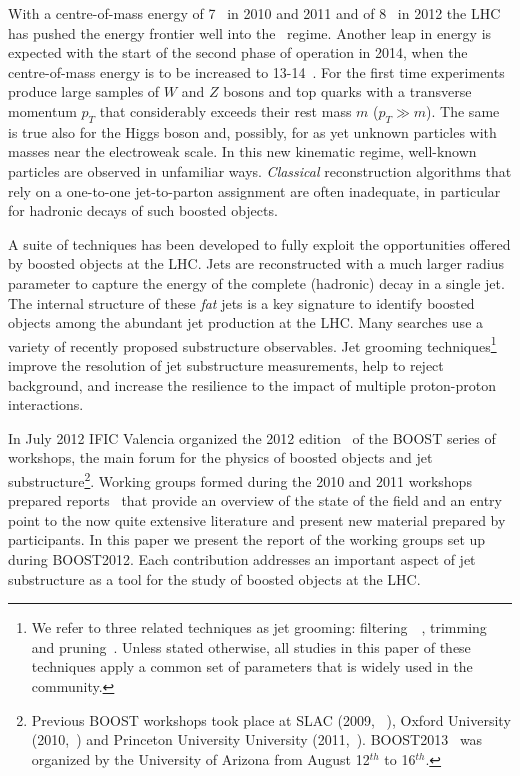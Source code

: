 
With a centre-of-mass energy of 7~\tev{} in 2010 and 2011 and 
of 8~\tev{} in 2012 the LHC has pushed the energy frontier
well into the~\tev{} regime. Another leap in energy is expected 
with the start of the second phase of operation in 2014, when the 
centre-of-mass energy is to be increased to 13-14~\tev{}.
For the first time experiments produce large samples of $W$ and $Z$ 
bosons and top quarks with a transverse momentum $p_T$ that considerably 
exceeds their rest mass $m$ ($p_T \gg m$). The same is true also for the Higgs 
boson and, possibly, for as yet unknown particles with masses near
the electroweak scale.  
In this new kinematic regime, well-known particles are observed in unfamiliar 
ways. {\it Classical} reconstruction algorithms that rely on a one-to-one
jet-to-parton assignment are often inadequate,
in particular for hadronic decays of such boosted objects.

A suite of techniques has been developed to fully exploit the opportunities 
offered by boosted objects at the LHC. Jets are reconstructed 
with a much larger radius parameter to capture the energy of the complete 
(hadronic) decay in a single jet. The internal structure of these 
{\it fat} jets is a key signature to identify boosted objects among the 
abundant jet production at the LHC. Many searches use a 
variety of recently proposed substructure observables.
Jet grooming techniques\footnote{We refer to three related techniques as jet
grooming: filtering~~\cite{Butterworth:2008iy}, 
trimming~\cite{Krohn:2009th} and 
pruning~\cite{Ellis:2009me}. Unless stated otherwise, all studies
in this paper of these techniques apply a common set of parameters that
is widely used in the community.} 
improve the resolution of jet substructure 
measurements, help to reject background, 
and increase the resilience to the impact of 
multiple proton-proton interactions.

In July 2012 IFIC Valencia organized the 2012 edition~\cite{boost12} 
of the BOOST series of workshops, the main forum for the physics of 
boosted objects and jet substructure\footnote{Previous BOOST workshops
took place at SLAC (2009, ~\cite{boost09}), 
Oxford University (2010,~\cite{boost10}) and Princeton 
University University (2011,~\cite{boost11}). BOOST2013~\cite{boost13} 
was organized by the University of Arizona from August 12$^{th}$ to 16$^{th}$.}.
Working groups formed during the 2010 and 2011 workshops prepared 
reports~\cite{Abdesselam:2010pt,Altheimer:2012mn} that provide an
overview of the state of the field and an entry point to the 
now quite extensive literature and present new material prepared 
by participants. 
In this paper we present the report of the working groups set up 
during BOOST2012. Each contribution addresses an important aspect 
of jet substructure as a tool for the study of boosted objects at the LHC.

